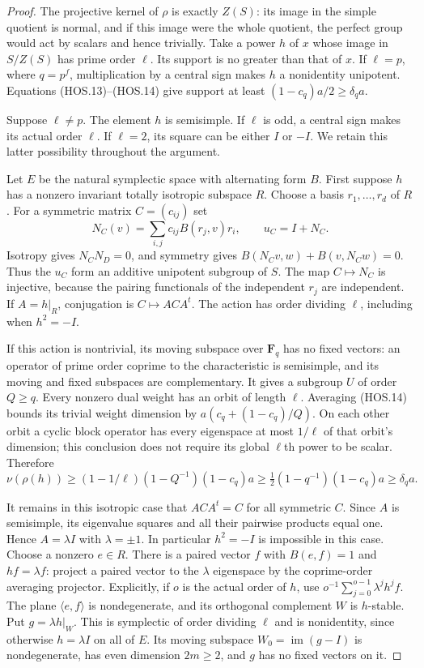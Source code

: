\begin{proof}
The projective kernel of $\rho$ is exactly $Z(S)$: its image in the
simple quotient is normal, and if this image were the whole quotient,
the perfect group would act by scalars and hence trivially. Take a
power $h$ of $x$ whose image in $S/Z(S)$ has prime order $\ell$.
Its support is no greater than that of $x$. If $\ell=p$, where
$q=p^f$, multiplication by a central sign makes $h$ a nonidentity
unipotent. Equations (HOS.13)--(HOS.14) give support at least
$(1-c_q)a/2\ge\delta_q a$.

Suppose $\ell\ne p$. The element $h$ is semisimple. If $\ell$
is odd, a central sign makes its actual order $\ell$. If $\ell=2$,
its square can be either $I$ or $-I$. We retain this latter
possibility throughout the argument.

Let $E$ be the natural symplectic space with alternating form
$B$. First suppose $h$ has a nonzero invariant totally isotropic
subspace $R$. Choose a basis $r_1,\ldots,r_d$ of $R$. For a
symmetric matrix $C=(c_{ij})$ set
\[
 N_C(v)=\sum_{i,j}c_{ij}B(r_j,v)r_i,\qquad u_C=I+N_C.
                                                               \tag{HOS.17}
\]
Isotropy gives $N_CN_D=0$, and symmetry gives
$B(N_Cv,w)+B(v,N_Cw)=0$. Thus the $u_C$ form an additive
unipotent subgroup of $S$. The map $C\mapsto N_C$ is injective,
because the pairing functionals of the independent $r_j$ are
independent. If $A=h|_R$, conjugation is $C\mapsto ACA^t$.
The action has order dividing $\ell$, including when $h^2=-I$.

If this action is nontrivial, its moving subspace over
$\mathbf F_q$ has no fixed vectors: an operator of prime order
coprime to the characteristic is semisimple, and its moving and
fixed subspaces are complementary. It gives a subgroup $U$ of
order $Q\ge q$. Every nonzero dual weight has an orbit of length
$\ell$. Averaging (HOS.14) bounds its trivial weight dimension by
$a(c_q+(1-c_q)/Q)$. On each other orbit a cyclic block operator
has every eigenspace at most $1/\ell$ of that orbit's dimension;
this conclusion does not require its global $\ell$th power to be
scalar. Therefore
\[
 \nu(\rho(h))\ge(1-1/\ell)(1-Q^{-1})(1-c_q)a
       \ge\tfrac12(1-q^{-1})(1-c_q)a\ge\delta_q a.         \tag{HOS.18}
\]

It remains in this isotropic case that $ACA^t=C$ for all symmetric
$C$. Since $A$ is semisimple, its eigenvalue squares and all their
pairwise products equal one. Hence $A=\lambda I$ with
$\lambda=\pm1$. In particular $h^2=-I$ is impossible in this
case. Choose a nonzero $e\in R$. There is a paired vector $f$
with $B(e,f)=1$ and $hf=\lambda f$: project a paired vector to
the $\lambda$ eigenspace by the coprime-order averaging projector.
Explicitly, if $o$ is the actual order of $h$, use
$o^{-1}\sum_{j=0}^{o-1}\lambda^j h^j f$.
The plane $\langle e,f\rangle$ is nondegenerate, and its orthogonal
complement $W$ is $h$-stable. Put $g=\lambda h|_W$. This is
symplectic of order dividing $\ell$ and is nonidentity, since
otherwise $h=\lambda I$ on all of $E$. Its moving subspace
$W_0=\operatorname{im}(g-I)$ is nondegenerate, has even dimension
$2m\ge2$, and $g$ has no fixed vectors on it.


\end{proof}
